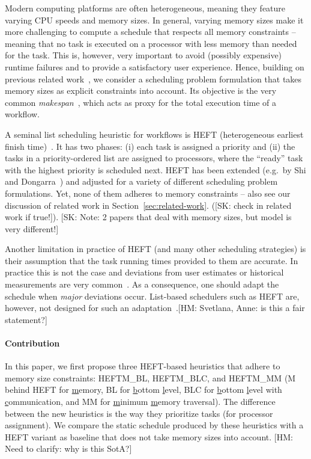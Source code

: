\documentclass[conference]{IEEEtran}
\newcommand{\algo}[1]{\textsc{#1}}
\newcommand{\heftmm}{\algo{HEFTM\_MM}\xspace}
\newcommand{\heftbl}{\algo{HEFTM\_BL}\xspace}
\newcommand{\heftblc}{\algo{HEFTM\_BLC}\xspace}
\newcommand{\skug}[1]{{\color{blue}[SK: #1]}}
\newcommand{\hmey}[1]{{\color{red}[HM: #1]}}
\begin{document}
    Modern computing platforms are often heterogeneous, meaning they feature varying CPU speeds
    and memory sizes. In general, varying memory sizes make it more challenging to compute
    a schedule that respects all memory constraints -- meaning that no task is executed on a 
    processor with less memory than needed for the task. This is, however, very important to
    avoid (possibly expensive) runtime failures and to provide a satisfactory user experience.
    Hence, building on previous related work~\cite{TODO}, we consider a scheduling problem 
    formulation that takes memory sizes as explicit constraints into account. Its objective is
    the very common \emph{makespan}~\cite{liu2018survey}, 
    which acts as proxy for the total execution time of a workflow.
    
    A seminal list scheduling heuristic for workflows is HEFT 
    (heterogeneous earliest finish time)~\cite{topcuoglu2002performance}.
    It has two phases: (i) each task is assigned a priority and (ii) the tasks in a priority-ordered list are assigned
    to processors, where the ``ready'' task with the highest priority is scheduled next.
    HEFT has been extended (e.g.\ by Shi and Dongarra~\cite{SHI2006665}) and adjusted for a variety of different scheduling problem formulations. 
    Yet, none of them adheres to memory constraints -- also see our discussion of related work
    in Section~\ref{sec:related-work}. (\skug{check in related work if true!}).
        \skug{Note: 2 papers that deal with memory sizes, but model is very different!}
        
    Another limitation in practice of HEFT (and many other scheduling strategies) is their 
    assumption that the task running times provided to them are accurate. In practice this is 
    not the case and deviations from user estimates or historical measurements are 
    very common~\cite{TODO}. As a consequence, one should adapt the schedule when \emph{major}
    deviations occur. List-based schedulers such as HEFT are, however, not designed for 
    such an adaptation~\cite{TODO}.\hmey{Svetlana, Anne: is this a fair statement?}
    

    \paragraph*{Contribution} In this paper, we first propose three HEFT-based heuristics
    that adhere to memory size constraints: \heftbl, \heftblc, and \heftmm
    (M behind HEFT for \underline{m}emory, BL for \underline{b}ottom \underline{l}evel,
    BLC for \underline{b}ottom \underline{l}evel with \underline{c}ommunication, 
    and MM for \underline{m}inimum \underline{m}emory traversal).
    The difference between the new heuristics is the way they prioritize tasks (for processor assignment).
    We compare the static schedule produced by these heuristics with a HEFT variant as
    baseline that does not take memory sizes into account. \hmey{Need to clarify: 
    why is this SotA?}
    
\end{document}
